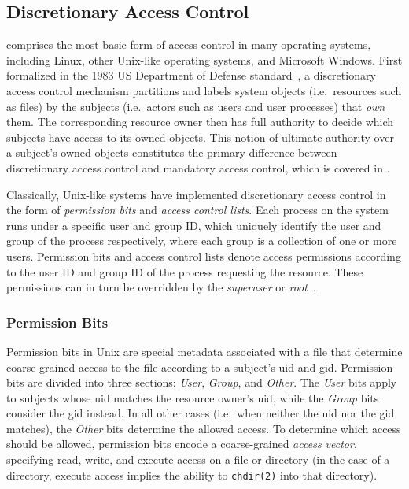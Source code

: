\subsection{Discretionary Access Control}%
\label{ss:dac}

\textit{} comprises the most basic form of access
control in many operating systems, including Linux, other Unix-like operating systems, and
Microsoft Windows. First formalized in the 1983 US Department of Defense
standard~\cite{orange_book}, a discretionary access control mechanism partitions and
labels system objects (i.e.\ resources such as files) by the subjects (i.e.\ actors such as
users and user processes) that \textit{own} them. The corresponding resource owner then
has full authority to decide which subjects have access to its owned objects. This notion
of ultimate authority over a subject's owned objects constitutes the primary difference
between discretionary access control and mandatory access control, which is covered in
.

Classically, Unix-like systems have implemented discretionary access control in the form
of \textit{permission bits} and \textit{access control lists}. Each process on the system
runs under a specific user and group ID, which uniquely identify the user and group of the
process respectively, where each group is a collection of one or more users. Permission
bits and access control lists denote access permissions according to the user ID and group
ID of the process requesting the resource. These permissions can in turn be overridden by
the \textit{superuser} or \textit{root}~\cite{van_oorschot2020_tools_jewels,
jaeger2008_os_security}.

\subsubsection*{Permission Bits}

Permission bits in Unix are special metadata associated with a file that determine
coarse-grained access to the file according to a subject's \gls{uid} and \gls{gid}.
Permission bits are divided into three sections: \textit{User}, \textit{Group}, and
\textit{Other}. The \textit{User} bits apply to subjects whose \gls{uid} matches the
resource owner's \gls{uid}, while the \textit{Group} bits consider the \gls{gid} instead.
In all other cases (i.e.\ when neither the \gls{uid} nor the \gls{gid} matches), the
\textit{Other} bits determine the allowed access. To determine which access should be
allowed, permission bits encode a coarse-grained \textit{access vector}, specifying read,
write, and execute access on a file or directory (in the case of a directory, execute
access implies the ability to \texttt{chdir(2)} into that directory).

